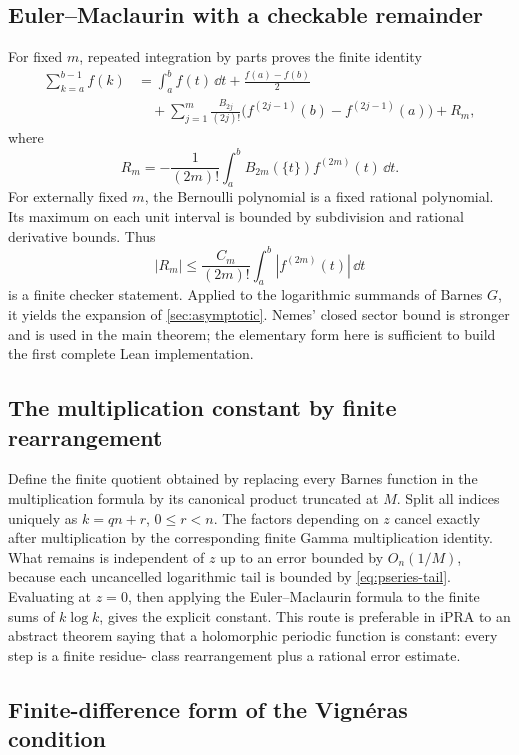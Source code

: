 \subsection{Euler--Maclaurin with a checkable remainder}

For fixed \(m\), repeated integration by parts proves the finite identity
\begin{align}
 \sum_{k=a}^{b-1}f(k)
 &=\int_a^b f(t)\,\dd t+\frac{f(a)-f(b)}2\\
 &\quad+\sum_{j=1}^{m}
 \frac{B_{2j}}{(2j)!}
 \bigl(f^{(2j-1)}(b)-f^{(2j-1)}(a)\bigr)+R_m,
\end{align}
where
\[
 R_m=-\frac1{(2m)!}\int_a^b
 B_{2m}(\{t\})f^{(2m)}(t)\,\dd t.
\]
For externally fixed \(m\), the Bernoulli polynomial is a fixed rational
polynomial.  Its maximum on each unit interval is bounded by subdivision and
rational derivative bounds.  Thus
\[
 |R_m|\le \frac{C_m}{(2m)!}
             \int_a^b|f^{(2m)}(t)|\,\dd t
\]
is a finite checker statement.  Applied to the logarithmic summands of Barnes
\(G\), it yields the expansion of \cref{sec:asymptotic}.  Nemes' closed sector
bound is stronger and is used in the main theorem; the elementary form here is
sufficient to build the first complete Lean implementation.

\subsection{The multiplication constant by finite rearrangement}

Define the finite quotient obtained by replacing every Barnes function in the
multiplication formula by its canonical product truncated at \(M\).  Split all
indices uniquely as \(k=qn+r\), \(0\le r<n\).  The factors depending on
\(z\) cancel exactly after multiplication by the corresponding finite Gamma
multiplication identity.  What remains is independent of \(z\) up to an error
bounded by \(O_n(1/M)\), because each uncancelled logarithmic tail is bounded
by \cref{eq:pseries-tail}.  Evaluating at \(z=0\), then applying the
Euler--Maclaurin formula to the finite sums of \(k\log k\), gives the explicit
constant.  This route is preferable in iPRA to an abstract theorem saying that
a holomorphic periodic function is constant: every step is a finite residue-
class rearrangement plus a rational error estimate.

\subsection{Finite-difference form of the Vign\'eras condition}

